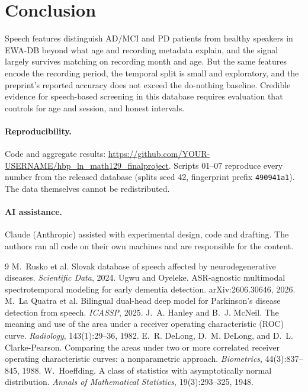 \documentclass[10pt]{article}
\newcommand{\repourl}{https://github.com/YOUR-USERNAME/hbp_ln_math129_finalproject}%
\begin{document}
\section{Conclusion}
Speech features distinguish AD/MCI and PD patients from healthy speakers in EWA-DB beyond what age and recording metadata explain, and the signal largely survives matching on recording month and age. But the same features encode the recording period, the temporal split is small and exploratory, and the preprint's reported accuracy does not exceed the do-nothing baseline. Credible evidence for speech-based screening in this database requires evaluation that controls for age and session, and honest intervals.

\paragraph{Reproducibility.} Code and aggregate results: \url{\repourl}. Scripts 01--07 reproduce every number from the released database (splits seed 42, fingerprint prefix \texttt{490941a1}). The data themselves cannot be redistributed.

\paragraph{AI assistance.} %
Claude (Anthropic) assisted with experimental design, code and drafting. The authors ran all code on their own machines and are responsible for the content.

\begin{thebibliography}{9}\small
{} M.~Rusko et al. Slovak database of speech affected by neurodegenerative diseases. \emph{Scientific Data}, 2024.
 Ugwu and Oyeleke. ASR-agnostic multimodal spectrotemporal modeling for early dementia detection. arXiv:2606.30646, 2026.
 M.~La Quatra et al. Bilingual dual-head deep model for Parkinson's disease detection from speech. \emph{ICASSP}, 2025.
 J.~A. Hanley and B.~J. McNeil. The meaning and use of the area under a receiver operating characteristic (ROC) curve. \emph{Radiology}, 143(1):29--36, 1982.
 E.~R. DeLong, D.~M. DeLong, and D.~L. Clarke-Pearson. Comparing the areas under two or more correlated receiver operating characteristic curves: a nonparametric approach. \emph{Biometrics}, 44(3):837--845, 1988.
 W.~Hoeffding. A class of statistics with asymptotically normal distribution. \emph{Annals of Mathematical Statistics}, 19(3):293--325, 1948.
\end{thebibliography}
\end{document}
